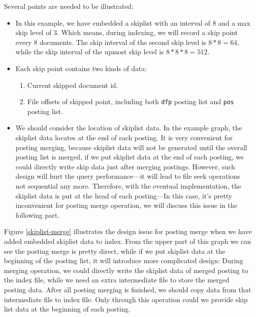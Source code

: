 Several points are needed to be illustrated:
\begin{itemize}
 \item In this example, we have embedded a skiplist with an interval of 8 and a max skip level of 3. Which means, during indexing, we will record a skip point every 8 documents. The skip interval of the second skip level is $8*8=64$,
while the skip interval of the upmost skip level is $8*8*8=512$.
 \item Each skip point contains two kinds of data:
   \begin{enumerate}
    \item Current skipped document id.
    \item File offsets of skipped point, including both \texttt{dfp} posting list and \texttt{pos} posting list.
   \end{enumerate}
 \item We should consider the location of skiplist data. In the example graph, the skiplist data locates at the end of each posting. It is very convenient for posting merging, because skiplist data will not be generated until the overall posting
list is merged, if we put skiplist data at the end of each posting, we could directly write skip data just after merging postings.  However, such design will hurt the query performance---it will lead to file seek operations not sequential
any more. Therefore, with the eventual implementation, the skiplist data is put at the head of each posting---In this case, it's pretty inconvenient for posting merge operation, we will discuss this issue in the following part.
\end{itemize}

Figure \ref{skiplist-merge} illustrates the design issue for posting merge when we have added embedded skiplist data to index. From the upper part of this graph we can see the posting merge is pretty direct, while if we put skiplist data
at the beginning of the posting list, it will introduce more complicated design: During merging operation, we could directly write the skiplist data of merged posting to the index file, while we need an extra intermediate file to store the 
merged posting data. After all posting merging is finished, we should copy data from that intermediate file to index file. Only through this operation could we provide skip list data at the beginning of each posting.

